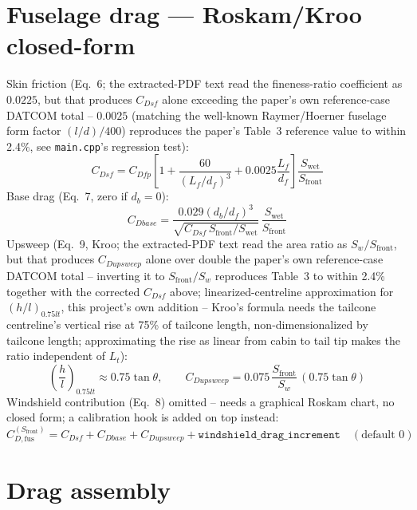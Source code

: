 \documentclass[11pt]{article}
\begin{document}
\section{Fuselage drag --- Roskam/Kroo closed-form}
\label{sec:drag}

Skin friction (Eq.~6; the extracted-PDF text read the fineness-ratio
coefficient as $0.0225$, but that produces $C_{Dsf}$ alone exceeding the
paper's own reference-case DATCOM total -- $0.0025$ (matching the
well-known Raymer/Hoerner fuselage form factor $(l/d)/400$) reproduces
the paper's Table~3 reference value to within 2.4\%, see
\texttt{main.cpp}'s regression test):
\begin{equation}
C_{Dsf} = C_{Dfp}\left[1+\frac{60}{(L_f/d_f)^3}+0.0025\frac{L_f}{d_f}\right]\frac{S_{\text{wet}}}{S_{\text{front}}}
\end{equation}
Base drag (Eq.~7, zero if $d_b=0$):
\begin{equation}
C_{Dbase} = \frac{0.029(d_b/d_f)^3}{\sqrt{C_{Dsf}\,S_{\text{front}}/S_{\text{wet}}}}\,\frac{S_{\text{wet}}}{S_{\text{front}}}
\end{equation}
Upsweep (Eq.~9, Kroo; the extracted-PDF text read the area ratio as
$S_w/S_{\text{front}}$, but that produces $C_{Dupsweep}$ alone over
double the paper's own reference-case DATCOM total -- inverting it to
$S_{\text{front}}/S_w$ reproduces Table~3 to within 2.4\% together with
the corrected $C_{Dsf}$ above; linearized-centreline approximation for
$(h/l)_{0.75lt}$, this project's own addition -- Kroo's formula needs
the tailcone centreline's vertical rise at 75\% of tailcone length,
non-dimensionalized by tailcone length; approximating the rise as
linear from cabin to tail tip makes the ratio independent of $L_t$):
\begin{equation}
\left(\frac hl\right)_{0.75lt}\approx0.75\tan\theta,
\qquad
C_{Dupsweep} = 0.075\,\frac{S_{\text{front}}}{S_w}\,(0.75\tan\theta)
\end{equation}
Windshield contribution (Eq.~8) omitted -- needs a graphical Roskam
chart, no closed form; a calibration hook is added on top instead:
\begin{equation}
C_{D,\text{fus}}^{(S_{\text{front}})} = C_{Dsf}+C_{Dbase}+C_{Dupsweep} + \texttt{windshield\_drag\_increment} \quad(\text{default }0)
\end{equation}

\section{Drag assembly}
\label{sec:cdassembly}
\end{document}
